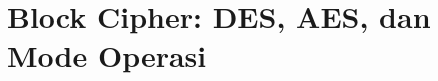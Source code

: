 \documentclass[../buku_kriptografi.tex]{subfiles}
\begin{document}
\ifdefined\InMainDocument\else\setcounter{chapter}{6}\fi

\chapter{Block Cipher: DES, AES, dan Mode Operasi}






\ifdefined\InMainDocument\else


\fi
\end{document}
